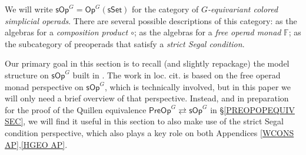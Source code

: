 \documentclass[a4paper,10pt]{article}%
\numberwithin{equation}{section}
\numberwithin{figure}{section}
\theoremstyle{definition} %
\newcommand{\1}{\ensuremath{\mathbbm 1}}%
\begin{document}
We will write $\mathsf{sOp}^G = \mathsf{Op}^{G}(\mathsf{sSet})$
for the 
category of \textit{$G$-equivariant colored simplicial operads}.
There are several possible descriptions of this category:
as the algebras for a \emph{composition product $\circ$};
as the algebras for a \emph{free operad monad} $\mathbb{F}$;
as the subcategory of preoperads that satisfy a \emph{strict Segal condition}.

Our primary goal in this section is to recall (and slightly repackage) the model structure on $\mathsf{sOp}^G$ built in 
\cite{BP_HGOP}.
The work in loc. cit. is based on the free operad monad perspective on 
$\mathsf{sOp}^G$, which is technically involved,
but in this paper we will only need a brief overview of that perspective.
%
Instead, and in preparation for the proof of the Quillen equivalence
$\mathsf{PreOp}^G \rightleftarrows \mathsf{sOp}^G$
in \S \ref{PREOPOPEQUIV SEC},
we will find it useful in this section to also make use of the 
strict Segal condition perspective,
which also plays a key role on both 
Appendices \ref{WCONS AP},\ref{HGEO AP}.
\end{document}
